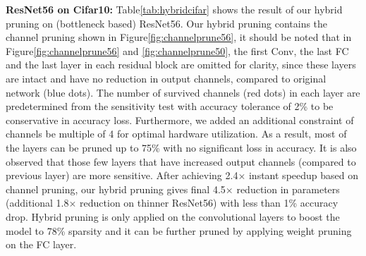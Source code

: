 \documentclass{article}
\begin{document}
\textbf{ResNet56 on Cifar10:} 
Table\ref{tab:hybridcifar} shows the result of our hybrid pruning on (bottleneck based) ResNet56. %
Our hybrid pruning contains the channel pruning shown in Figure\ref{fig:channelprune56}, it should be noted that in Figure\ref{fig:channelprune56} and \ref{fig:channelprune50}, the first Conv, the last FC and the last layer in each residual block are omitted for clarity, since these layers are intact and have no reduction in output channels, compared to original network (blue dots). The number of survived channels (red dots) in each layer are predetermined from the sensitivity test with accuracy tolerance of 2\% to be conservative in accuracy loss. Furthermore, we added an additional constraint of channels be multiple of 4 for optimal hardware utilization. %
As a result, most of the layers can be pruned up to 75\% with no significant loss in accuracy. It is also observed that those few layers that have increased output channels (compared to previous layer) are more sensitive. 
After achieving 2.4$\times$ instant speedup based on channel pruning, our hybrid pruning gives final 4.5$\times$ reduction in parameters (additional 1.8$\times$ reduction on thinner ResNet56) with less than 1\% accuracy drop. Hybrid pruning is only applied on the convolutional layers to boost the model to 78\% sparsity and it can be further pruned by applying weight pruning on the FC layer.  
\end{document}
